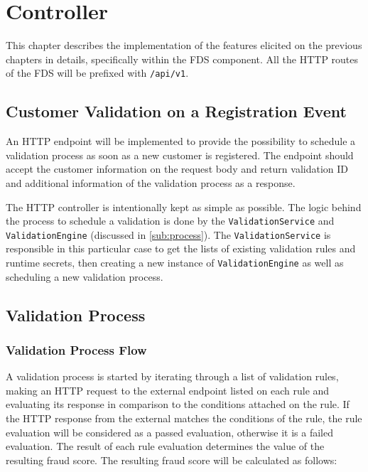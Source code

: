 \section{Controller}

  This chapter describes the implementation of the features elicited on the previous chapters in details, specifically within the FDS component. All the HTTP routes of the FDS will be prefixed with \verb;/api/v1;.

  \subsection{Customer Validation on a Registration Event}

    An HTTP endpoint will be implemented to provide the possibility to schedule a validation process as soon as a new customer is registered. The endpoint should accept the customer information on the request body and return validation ID and additional information of the validation process as a response. 
    
    The HTTP controller is intentionally kept as simple as possible. The logic behind the process to schedule a validation is done by the \verb;ValidationService; and \verb;ValidationEngine; (discussed in \autoref{sub:process}). The \verb;ValidationService; is responsible in this particular case to get the lists of existing validation rules and runtime secrets, then creating a new instance of \verb;ValidationEngine; as well as scheduling a new validation process. 

  \subsection{Validation Process}
    \label{sub:process}

    \subsubsection{Validation Process Flow}
    
      A validation process is started by iterating through a list of validation rules, making an HTTP request to the external endpoint listed on each rule and evaluating its response in comparison to the conditions attached on the rule. If the HTTP response from the external matches the conditions of the rule, the rule evaluation will be considered as a passed evaluation, otherwise it is a failed evaluation. The result of each rule evaluation determines the value of the resulting fraud score. The resulting fraud score will be calculated as follows: 

